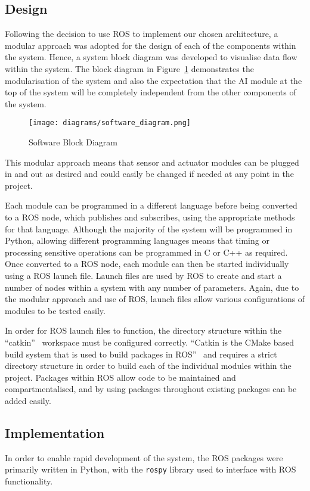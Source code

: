 \subsection{Design}\label{soft/ROS/design}
Following the decision to use ROS to implement our chosen architecture, a modular
approach was adopted for the design of each of the components within the system.
Hence, a system block diagram was developed to visualise data flow
within the system. The block diagram in Figure~\ref{BlockDiagram}
demonstrates the modularisation of the system and also the
expectation that the AI module at the top of the system will be completely
independent from the other components of the system.

\begin{figure}[!ht]
	\centering
	\texttt{[image: diagrams/software\_diagram.png]}
	\caption{Software Block Diagram}\label{BlockDiagram}

\end{figure}

This modular approach means that sensor and actuator modules can be plugged in
and out as desired and could easily be changed if needed at any point in the
project.

Each module can be programmed in a different language before being converted to a
ROS node, which publishes and subscribes, using the appropriate methods for that
language. Although the majority of the system will be programmed in Python,
allowing different programming languages means that timing or processing
sensitive operations can be programmed in C or C++ as required. Once converted to
a ROS node, each module can then be started individually using a ROS launch file.
Launch files are used by ROS to create and start a number of nodes within a
system with any number of parameters. Again, due to the modular approach and use
of ROS, launch files allow various configurations of modules to be tested easily.

In order for ROS launch files to function, the directory structure within the
``catkin''~\cite{catkin} workspace must be configured correctly. ``Catkin is the
CMake based build system that is used to build packages in ROS''~\cite{gitcatkin}
and requires a strict directory structure in order to build each of the
individual modules within the project. Packages within ROS allow code to be
maintained and compartmentalised, and by using packages throughout existing
packages can be added easily.


\subsection{Implementation}\label{soft/ROS/impl}
In order to enable rapid development of the system, the ROS packages were
primarily written in Python, with the \verb|rospy| library used to
interface with ROS functionality.

